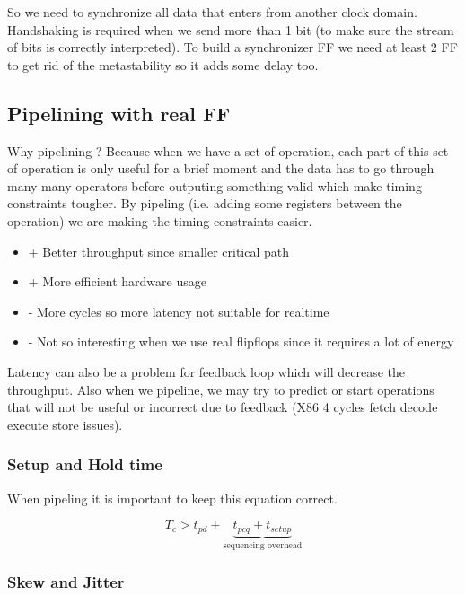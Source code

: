 \documentclass{report}
\begin{document}
So we need to synchronize all data that enters from another clock domain. Handshaking is required when we send more than 1 bit (to make sure the stream of bits is correctly interpreted). To build a synchronizer FF we need at least 2 FF to get rid of the metastability so it adds some delay too.

\subsection{Pipelining with real FF}

Why pipelining ? Because when we have a set of operation, each part of this set of operation is only useful for a brief moment and the data has to go through many many operators before outputing something valid which make timing constraints tougher. By pipeling (i.e. adding some registers between the operation) we are making the timing constraints easier.

\begin{itemize}
    \item + Better throughput since smaller critical path
    \item + More efficient hardware usage 
    \item - More cycles so more latency not suitable for realtime
    \item - Not so interesting when we use real flipflops since it requires a lot of energy
\end{itemize}

Latency can also be a problem for feedback loop which will decrease the throughput. Also when we pipeline, we may try to predict or start operations that will not be useful or incorrect due to feedback (X86 4 cycles fetch decode execute store issues).

\subsubsection{Setup and Hold time}

When pipeling it is important to keep this equation correct.

\begin{equation}
    T_c > t_{pd} + \underbrace{t_{pcq} + t_{setup}}_{\text{sequencing overhead}}
\end{equation}


\subsubsection{Skew and Jitter}
\end{document}
